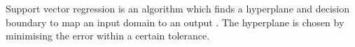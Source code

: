 %
%
%
%
%
%
%
%











Support vector regression is an algorithm which finds a hyperplane and decision boundary to map an input domain to an output \cite{Cortes1995}. The hyperplane is chosen by minimising the error within a certain tolerance.

